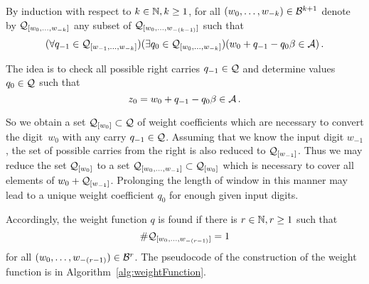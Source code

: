         By induction with respect to $k \in \mathbb{N}, k\geq 1$, for all $(w_{0}, \dots, w_{-k})\in \mathcal{B}^{k+1}$ denote by $\mathcal{Q}_{[w_{0}, \dots, w_{-k}]}$ any subset of  $\mathcal{Q}_{[w_{0}, \dots, w_{-(k-1)}]}$ such that 
        $$
           (\forall q_{-1} \in \mathcal{Q}_{[w_{-1}, \dots, w_{-k}]})(\exists q_0 \in \mathcal{Q}_{[w_{0}, \dots, w_{-k}]})(w_0 + q_{-1} - q_0 \beta \in \mathcal{A})\,.
        $$
        
    
 
    The idea is to check all possible right carries $q_{-1}\in\mathcal{Q}$ and determine values $q_0\in\mathcal{Q}$ such that 
    $$
    z_0=w_0 + q_{-1} - q_0 \beta \in \mathcal{A} \,.
    $$  
    
    So we obtain a set $\mathcal{Q}_{[w_0]}\subset\mathcal{Q}$ of weight coefficients which are necessary to convert the digit~$w_0$ with any carry $q_{-1}\in\mathcal{Q}$. Assuming that we know the input digit $w_{-1}$, the set of possible carries from the right is also reduced to $\mathcal{Q}_{[w_{-1}]}$. Thus we may reduce the set $\mathcal{Q}_{[w_0]}$ to a set $\mathcal{Q}_{[w_{0}, \dots, w_{-1}]}\subset \mathcal{Q}_{[w_0]}$ which is necessary to cover all elements of $w_0 + \mathcal{Q}_{[w_{-1}]}$. Prolonging the length of window in this manner may lead to a unique weight coefficient $q_0$ for enough given input digits.  
    
    Accordingly, the weight function $q$ is found if there is $r\in\mathbb{N}, r\geq 1$ such that 
    $$
    \#\mathcal{Q}_{[w_{0}, \dots, w_{-(r-1)}]}=1
    $$
    for all $(w_{0}, \dots, w_{-(r-1)}) \in \mathcal{B}^r$. The pseudocode of the construction of the weight function is in  Algorithm~\ref{alg:weightFunction}. 
    
